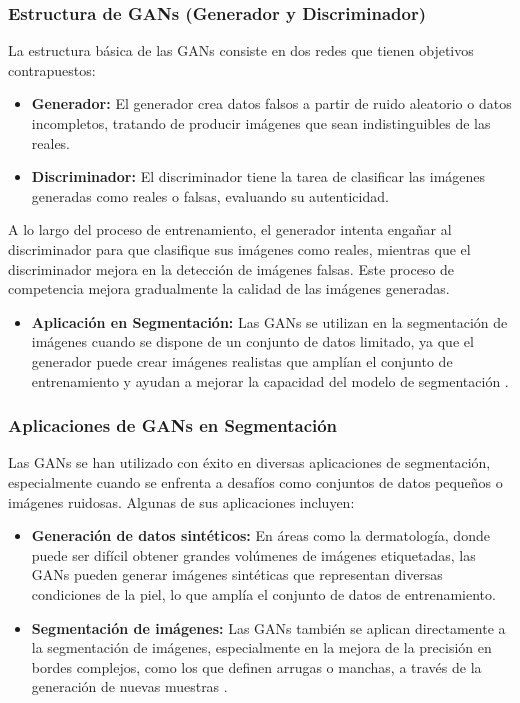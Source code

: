 \subsubsection{Estructura de GANs (Generador y Discriminador)}  
La estructura básica de las GANs consiste en dos redes que tienen objetivos contrapuestos:
\begin{itemize}
    \item \textbf{Generador:} El generador crea datos falsos a partir de ruido aleatorio o datos incompletos, tratando de producir imágenes que sean indistinguibles de las reales.
    \item \textbf{Discriminador:} El discriminador tiene la tarea de clasificar las imágenes generadas como reales o falsas, evaluando su autenticidad.
\end{itemize}
A lo largo del proceso de entrenamiento, el generador intenta engañar al discriminador para que clasifique sus imágenes como reales, mientras que el discriminador mejora en la detección de imágenes falsas. Este proceso de competencia mejora gradualmente la calidad de las imágenes generadas.  
\begin{itemize}
    \item \textbf{Aplicación en Segmentación:} Las GANs se utilizan en la segmentación de imágenes cuando se dispone de un conjunto de datos limitado, ya que el generador puede crear imágenes realistas que amplían el conjunto de entrenamiento y ayudan a mejorar la capacidad del modelo de segmentación \cite{autor2020gans}.
\end{itemize}

\subsubsection{Aplicaciones de GANs en Segmentación}  
Las GANs se han utilizado con éxito en diversas aplicaciones de segmentación, especialmente cuando se enfrenta a desafíos como conjuntos de datos pequeños o imágenes ruidosas. Algunas de sus aplicaciones incluyen:
\begin{itemize}
    \item \textbf{Generación de datos sintéticos:} En áreas como la dermatología, donde puede ser difícil obtener grandes volúmenes de imágenes etiquetadas, las GANs pueden generar imágenes sintéticas que representan diversas condiciones de la piel, lo que amplía el conjunto de datos de entrenamiento.
    \item \textbf{Segmentación de imágenes:} Las GANs también se aplican directamente a la segmentación de imágenes, especialmente en la mejora de la precisión en bordes complejos, como los que definen arrugas o manchas, a través de la generación de nuevas muestras \cite{autor2021gans_segmentacion}.
\end{itemize}

